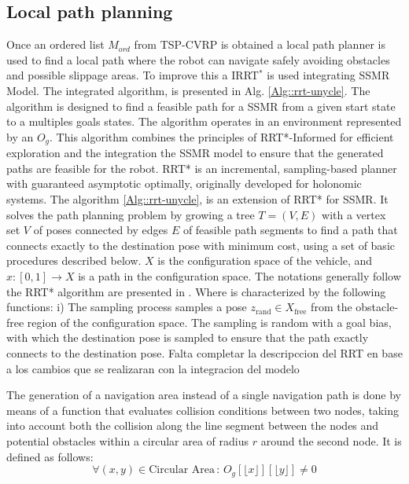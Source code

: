 \documentclass[conference]{IEEEtran}
\newcommand{\revR}[1]{\textcolor{myYellow}{#1}}
\begin{document}
\subsection{Local path planning}
\label{Subsec::global_path_planning}
Once an ordered list $M_{ord}$ from TSP-CVRP is obtained a local path planner is used to find a local path where the robot can navigate safely avoiding obstacles and possible slippage areas. To improve this a IRRT$^*$ is used integrating SSMR Model. The integrated algorithm, is presented in Alg. \ref{Alg::rrt-unycle}. The algorithm is designed to find a feasible path for a SSMR from a given start state to a multiples goals states. The algorithm operates in an environment represented by an $O_{g}$. This algorithm combines the principles of RRT*-Informed for efficient exploration and the integration the SSMR model to ensure that the generated paths are feasible for the robot. RRT* \cite{Qi2021} is an incremental, sampling-based planner with guaranteed asymptotic optimally, originally developed for holonomic systems. The algorithm \ref{Alg::rrt-unycle},  is an extension of RRT* for SSMR. It solves the path planning problem by growing a tree $T = (V, E)$ with a vertex set $V$ of poses connected by edges $E$ of feasible path segments to find a path that connects exactly to the destination pose with minimum cost, using a set of basic procedures described below. $X$ is the configuration space of the vehicle, and $x: [0, 1] \to X$ is a path in the configuration space. The notations generally follow the RRT* algorithm are presented in \cite{Qi2021}. Where is characterized by the following functions: i) The sampling process samples a pose $z_{\text{rand}} \in X_{\text{free}}$ from the obstacle-free region of the configuration space. The sampling is random with a goal bias, with which the destination pose is sampled to ensure that the path exactly connects to the destination pose. 
\revR{Falta completar la descripccion del RRT en base a los cambios que se realizaran con la integracion del modelo}

The generation of a navigation area instead of a single navigation path is done by means of a function that evaluates collision conditions between two nodes, taking into account both the collision along the line segment between the nodes and potential obstacles within a circular area of radius $r$ around the second node. It is defined as follows:
\begin{equation}
\forall (x, y) \in \text{Circular Area}\, : \, O_{g}[\lfloor x \rfloor][\lfloor y \rfloor] \neq 0 
\end{equation}
\end{document}
